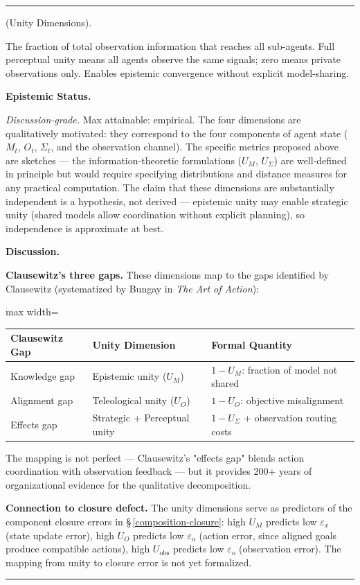 \documentclass[11pt,oneside]{article}
\newcounter{claim}[section]
\renewcommand{\theclaim}{\thesection.\arabic{claim}}
\newenvironment{segment}[2]{%
  \refstepcounter{claim}%
  \bigskip\noindent\hrule\smallskip
  \noindent{\bfseries #1~\theclaim}\enskip(#2).\par\smallskip
  \noindent\ignorespaces
}{%
  \par\smallskip\noindent\hrule\bigskip
}
\newenvironment{discussion}[1][]{\begin{segment}{Discussion}{#1}}{\end{segment}}
\begin{document}
\begin{discussion}[Unity Dimensions]
The fraction of total observation information that reaches all sub-agents. Full perceptual unity means all agents observe the same signals; zero means private observations only. Enables epistemic convergence without explicit model-sharing.


\medskip\noindent\textbf{Epistemic Status.}


\textit{Discussion-grade.} Max attainable: empirical. The four dimensions are qualitatively motivated: they correspond to the four components of agent state ($M_t$, $O_t$, $\Sigma_t$, and the observation channel). The specific metrics proposed above are sketches — the information-theoretic formulations ($U_M$, $U_\Sigma$) are well-defined in principle but would require specifying distributions and distance measures for any practical computation. The claim that these dimensions are substantially independent is a hypothesis, not derived — epistemic unity may enable strategic unity (shared models allow coordination without explicit planning), so independence is approximate at best.


\medskip\noindent\textbf{Discussion.}


\textbf{Clausewitz's three gaps.} These dimensions map to the gaps identified by Clausewitz (systematized by Bungay in \textit{The Art of Action}):

\begin{adjustbox}{max width=\textwidth}
\small
\begin{tabular}{lll}
\toprule
Clausewitz Gap & Unity Dimension & Formal Quantity \\
\midrule
Knowledge gap & Epistemic unity ($U_M$) & $1 - U_M$: fraction of model not shared \\
Alignment gap & Teleological unity ($U_O$) & $1 - U_O$: objective misalignment \\
Effects gap & Strategic + Perceptual unity & $1 - U_\Sigma$ + observation routing costs \\
\bottomrule
\end{tabular}
\end{adjustbox}


The mapping is not perfect — Clausewitz's "effects gap" blends action coordination with observation feedback — but it provides 200+ years of organizational evidence for the qualitative decomposition.

\textbf{Connection to closure defect.} The unity dimensions serve as predictors of the component closure errors in \S\,\ref{composition-closure}: high $U_M$ predicts low $\varepsilon_x$ (state update error), high $U_O$ predicts low $\varepsilon_a$ (action error, since aligned goals produce compatible actions), high $U_{\text{obs}}$ predicts low $\varepsilon_o$ (observation error). The mapping from unity to closure error is not yet formalized.


\end{discussion}
\end{document}
